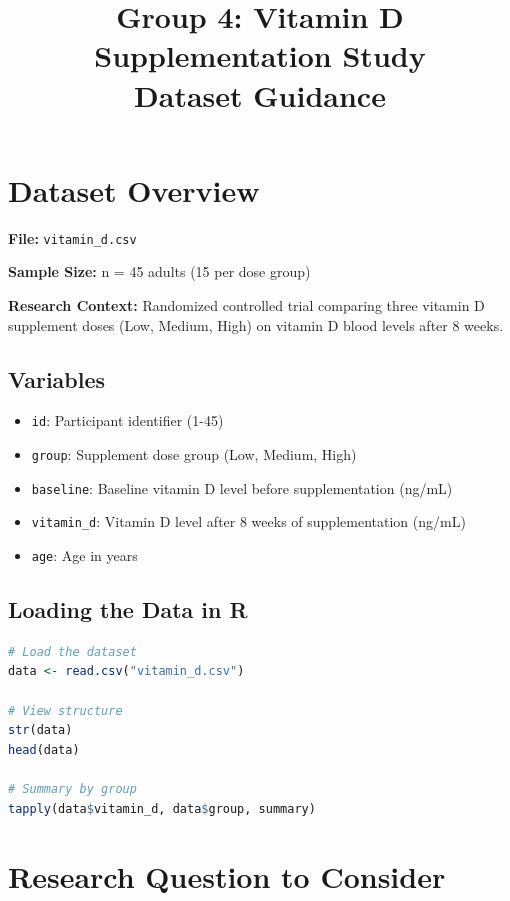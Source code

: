 \documentclass[11pt]{article}
\title{\textbf{Group 4: Vitamin D Supplementation Study}\\
\large{Dataset Guidance}}
\author{}
\date{}
\begin{document}
\maketitle

\section*{Dataset Overview}

\textbf{File:} \texttt{vitamin\_d.csv}

\textbf{Sample Size:} n = 45 adults (15 per dose group)

\textbf{Research Context:} Randomized controlled trial comparing three vitamin D supplement doses (Low, Medium, High) on vitamin D blood levels after 8 weeks.

\subsection*{Variables}

\begin{itemize}
\item \texttt{id}: Participant identifier (1-45)
\item \texttt{group}: Supplement dose group (Low, Medium, High)
\item \texttt{baseline}: Baseline vitamin D level before supplementation (ng/mL)
\item \texttt{vitamin\_d}: Vitamin D level after 8 weeks of supplementation (ng/mL)
\item \texttt{age}: Age in years
\end{itemize}

\subsection*{Loading the Data in R}

\begin{lstlisting}[language=R, basicstyle=\small\ttfamily, breaklines=true]
# Load the dataset
data <- read.csv("vitamin_d.csv")

# View structure
str(data)
head(data)

# Summary by group
tapply(data$vitamin_d, data$group, summary)
\end{lstlisting}

\section*{Research Question to Consider}
\end{document}
